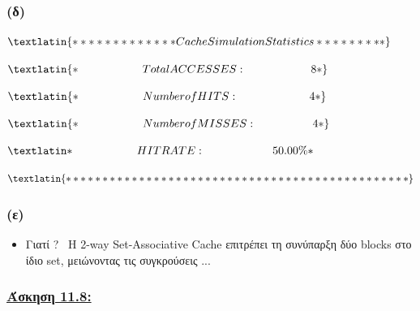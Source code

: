 \documentclass{article}
\begin{document}
\subsubsection*{\textbf{(δ)}}

$

\textlatin
{
************* Cache Simulation Statistics *********
}
$

$
\textlatin
{
* \hspace{2cm}            Total ACCESSES :  \hspace{2.02cm}               8 *
}
$

$
\textlatin
{
*     \hspace{2cm}        Number of HITS :        \hspace{2.2cm}         4 *
}
$

$
\textlatin
{
*       \hspace{2cm}      Number of MISSES :        \hspace{1.75cm}       4 *
}
$

$
\textlatin
{
*      \hspace{2cm}       HIT RATE :          \hspace{2.1cm}         50.00\% *
}
$

$
\textlatin
{
***********************************************
}
$

\subsubsection*{\textbf{(ε)}}

\begin{itemize}
    \item {Γιατί \textlatin{?}} \ Η \textlatin{2-way Set-Associative Cache} επιτρέπει τη συνύπαρξη δύο \textlatin{blocks} στο ίδιο \textlatin{set}, μειώνοντας τις συγκρούσεις ...
\end{itemize}










\newpage

\vspace{2.5cm}
\subsubsection*{\hspace{0.375cm} \underline{\textbf{Άσκηση 11.8:}}}
\vspace{0.75cm}
\end{document}

